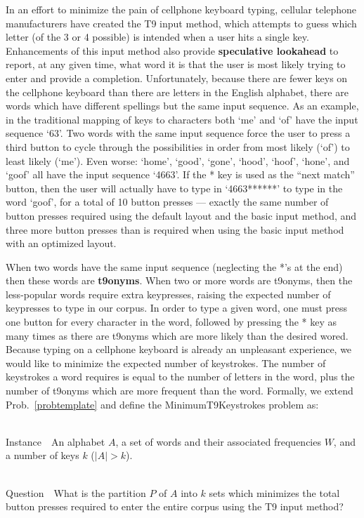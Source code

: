 \documentclass[runningheads]{llncs}
\newcommand{\newword}[1]{{\bf #1}}
\newcommand{\Instance}{{\sc Instance~}}
\newcommand{\Question}{~\\
{\sc Question~}}
\begin{document}
In an effort to minimize the pain of cellphone keyboard typing, cellular
telephone manufacturers have created the T9 input method, which attempts to
guess which letter (of the 3 or 4 possible) is intended when a user hits a
single key.  Enhancements of this input method also provide
\newword{speculative lookahead} to report, at any given time, what word it is
that the user is most likely trying to enter and provide a completion.
Unfortunately, because there are fewer keys on the cellphone keyboard than
there are letters in the English alphabet, there are words which have different
spellings but the same input sequence.  As an example, in the traditional
mapping of keys to characters both `me' and `of' have the input sequence
`63'.  Two words with the same input sequence force the user to press a third
button to cycle through the possibilities in order from most likely (`of') to
least likely (`me').  Even worse: `home', `good', `gone', `hood',
`hoof', `hone', and `goof' all have the input sequence `4663'.  If
the * key is used as the ``next match'' button, then the user will actually
have to type in `4663******' to type in the word `goof', for a total of 10
button presses --- exactly the same number of button presses required using the
default layout and the basic input method, and three more button presses than
is required when using the basic input method with an optimized layout.

When two words have the same input sequence (neglecting the *'s at the end)
then these words are \newword{t9onyms}.  When two or more words are t9onyms,
then the less-popular words require extra keypresses, raising the expected
number of keypresses to type in our corpus.  In order to type a given word, one
must press one button for every character in the word, followed by pressing
the * key as many times as there are t9onyms which are more likely than the
desired wored.  Because typing on a cellphone keyboard is already an unpleasant
experience, we would like to minimize the expected number of keystrokes.  The
number of keystrokes a word requires is equal to the number of letters in the
word, plus the number of t9onyms which are more frequent than the word.
Formally, we extend Prob.~\ref{probtemplate} and define the {\sc
MinimumT9Keystrokes} problem as:

\begin{prob}~\\
\label{thm:minstrokes}
\Instance\ An alphabet $A$, a set of words and their associated frequencies
$W$, and a number of keys $k$ ($|A| > k$).

\Question\ What is the partition $P$ of $A$ into $k$ sets which minimizes the
total button presses required to enter the entire corpus using the T9 input
method?
\end{prob}
\end{document}
